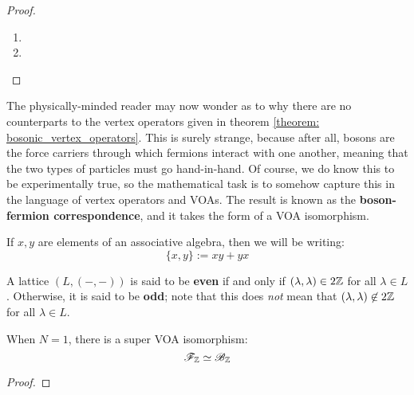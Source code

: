                \begin{proof}
                    \begin{enumerate}
                        \item 
                        \item 
                    \end{enumerate}
                \end{proof}

            The physically-minded reader may now wonder as to why there are no  counterparts to the vertex operators given in theorem \ref{theorem: bosonic_vertex_operators}. This is surely strange, because after all, bosons are the force carriers through which fermions interact with one another, meaning that the two types of particles must go hand-in-hand. Of course, we do know this to be experimentally true, so the mathematical task is to somehow capture this in the language of vertex operators and VOAs. The result is known as the \textbf{boson-fermion correspondence}, and it takes the form of a VOA isomorphism.

            \begin{convention}
                If $x, y$ are elements of an associative algebra, then we will be writing:
                    $$\{x, y\} := xy + yx$$
            \end{convention}


            \begin{definition} \label{def: even_and_odd_lattices}
                A lattice $(L, (-, -))$ is said to be \textbf{even} if and only if $(\lambda, \lambda) \in 2\mathbb{Z}$ for all $\lambda \in L$. Otherwise, it is said to be \textbf{odd}; note that this does \textit{not} mean that $(\lambda, \lambda) \not \in 2\mathbb{Z}$ for all $\lambda \in L$.
            \end{definition}
            \begin{definition} \label{def: lattice_clifford_(super)_algebras}
                 
            \end{definition}
            
            \begin{theorem}  \label{theorem: boson_fermion_correspondence}
                When $N = 1$, there is a super VOA isomorphism:
                    $$\mathscr{F}_{\mathbb{Z}} \simeq \mathscr{B}_{\mathbb{Z}}$$
            \end{theorem}
                \begin{proof}
                    
                \end{proof}

